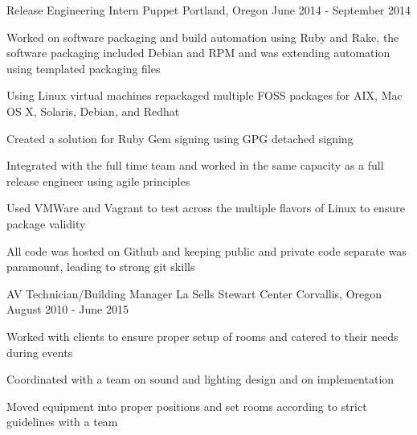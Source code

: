 \begin{cventries}
  \cventry
    {Release Engineering Intern} %
    {Puppet} %
    {Portland, Oregon} %
    {June 2014 - September 2014} %
    {
      \begin{cvitems} %
        \item {Worked on software packaging and build automation using Ruby and Rake, the software packaging included Debian and RPM and was extending automation using templated packaging files}
        \item {Using Linux virtual machines repackaged multiple FOSS packages for AIX, Mac OS X, Solaris, Debian, and Redhat}
        \item {Created a solution for Ruby Gem signing using GPG detached signing}
        \item {Integrated with the full time team and worked in the same capacity as a full release engineer using agile principles}
        \item {Used VMWare and Vagrant to test across the multiple flavors of Linux to ensure package validity}
        \item {All code was hosted on Github and keeping public and private code separate was paramount, leading to strong git skills}
      \end{cvitems}
    }

  \cventry
    {AV Technician/Building Manager} %
    {La Sells Stewart Center} %
    {Corvallis, Oregon} %
    {August 2010 - June 2015} %
    {
      \begin{cvitems} %
        \item {Worked with clients to ensure proper setup of rooms and catered to their needs during events}
        \item {Coordinated with a team on sound and lighting design and on implementation}
        \item {Moved equipment into proper positions and set rooms according to strict guidelines with a team}
      \end{cvitems}
    }

\end{cventries}
